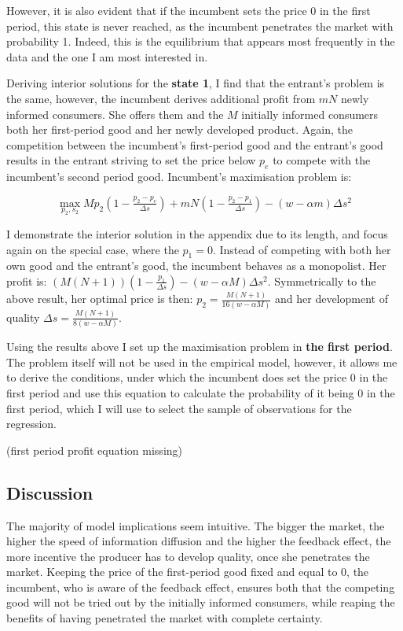 \documentclass{article}
\numberwithin{figure}{section}
\numberwithin{table}{section}
\theoremstyle{indented}
\numberwithin{equation}{section} %
\begin{document}
However, it is also evident that if the incumbent sets the price 0 in the first period, this state is never reached, as the incumbent penetrates the market with probability 1. Indeed, this is the equilibrium that appears most frequently in the data and the one I am most interested in.

Deriving interior solutions for the \textbf{state 1}, I find that the entrant's problem is the same, however, the incumbent derives additional profit from $mN$ newly informed consumers. She offers them and the $M$ initially informed consumers both her first-period good and her newly developed product. Again, the competition between the incumbent's first-period good and the entrant's good results in the entrant striving to set the price below $p_e$ to compete with the incumbent's second period good. Incumbent's maximisation problem is:

$$\max_{p_2, s_2}   Mp_2(1-\tfrac{p_2 - p_e}{\Delta s}) + mN(1-\tfrac{p_2 - p_1}{\Delta s}) - (w-\alpha m)\Delta s^2$$

I demonstrate the interior solution in the appendix due to its length, and focus again on the special case, where the $p_1 = 0$. Instead of competing with both her own good and the entrant's good, the incumbent behaves as a monopolist. Her profit is: $(M(N+1))(1-\tfrac{p_1}{\Delta s})-(w-\alpha M)\Delta s^2$. Symmetrically to the above result, her optimal price is then: $p_2 = \tfrac{M(N+1)}{16(w-\alpha M)}$ and her development of quality $\Delta s = \tfrac{M(N+1)}{8(w-\alpha M)}$.

Using the results above I set up the maximisation problem in \textbf{the first period}. The problem itself will not be used in the empirical model, however, it allows me to derive the conditions, under which the incumbent does set the price 0 in the first period and use this equation to calculate the probability of it being 0 in the first period, which I will use to select the sample of observations for the regression. 

(first period profit equation missing)

\subsection{Discussion}\label{intuition}

The majority of model implications seem intuitive. The bigger the market, the higher the speed of information diffusion and the higher the feedback effect, the more incentive the producer has to develop quality, once she penetrates the market. Keeping the price of the first-period good fixed and equal to 0, the incumbent, who is aware of the feedback effect, ensures both that the competing good will not be tried out by the initially informed consumers, while reaping the benefits of having penetrated the market with complete certainty. 
\end{document}
